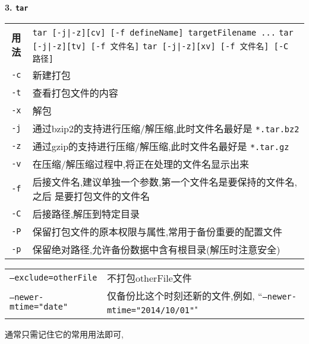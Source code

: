\par
\textbf{3. \texttt{tar}}
\begin{longtable}{c@{: }p{}}\hline\hline

    \textbf{用法} & \verb"tar [-j|-z][cv] [-f defineName] targetFilename ..." \newline
                    \verb"tar [-j|-z][tv] [-f 文件名]" \newline
                    \verb"tar [-j|-z][xv] [-f 文件名] [-C 路径]"
    \\

    \texttt{-c} & 新建打包 \\

    \texttt{-t} & 查看打包文件的内容 \\

    \texttt{-x} & 解包\\

    \texttt{-j} & 通过bzip2的支持进行压缩/解压缩,此时文件名最好是 \texttt{*.tar.bz2} \\

    \texttt{-z} & 通过gzip的支持进行压缩/解压缩,此时文件名最好是 \texttt{*.tar.gz} \\

    \texttt{-v} & 在压缩/解压缩过程中,将正在处理的文件名显示出来\\

    \texttt{-f} & 后接文件名,建议单独一个参数,第一个文件名是要保持的文件名,之后%
    是要打包文件的文件名 \\

    \texttt{-C} & 后接路径,解压到特定目录 \\

    \texttt{-P} & 保留打包文件的原本权限与属性,常用于备份重要的配置文件 \\

    \texttt{-p} & 保留绝对路径,允许备份数据中含有根目录(解压时注意安全) \\
\end{longtable}
\begin{longtable}{l@{: }p{}}
\texttt{--exclude=otherFile} & 不打包otherFile文件 \\
\texttt{--newer-mtime="date"} & 仅备份比这个时刻还新的文件,例如, ``\texttt{--newer-mtime="2014/10/01"}"  \\\hline
\end{longtable}
通常只需记住它的常用用法即可,
